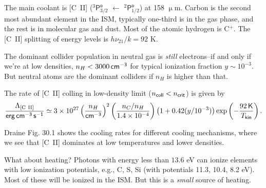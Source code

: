 \documentclass{tufte-handout}
\renewcommand{\rm}{\sf}
\renewcommand{\textrm}{\textsf}
\renewcommand{\smallcaps}[1]{{\smaller~\textsc{#1}}}
\newcommand{\spec}[2]{\textnormal{#1}\smallcaps{#2}} %
\newcommand{\term}[4]{$^{#1}\textrm{#2}_{#3}^{\textrm{#4}}$}
\newcommand{\m}{\upmu} %
\newcommand{\um}{$\m{}$m}
\begin{document}
The main coolant is [\spec{C}{II}] (\term{3}{P}{3/2}{o} $\leftarrow$ \term{2}{P}{1/2}{o}) at 158 \um{}. Carbon is the second most abundant element in the ISM, typically one-third is in the gas phase, and the rest is in molecular gas and dust. Most of the atomic hydrogen is C$^+$. The [\spec{C}{II}] splitting of energy levels is $h\nu_{21}/k = 92 $ K.

The dominant collider population in neutral gas is \textit{still} electrons--if and only if we're at low densities, $n_H < 3000 {\rm\, cm^{-3}}$ for typical ionization fraction $y \sim 10^{-3}$. But neutral atoms are the dominant colliders if $n_H$ is higher than that.

The rate of [\spec{C}{II}] colling in low-density limit ($n_{\rm coll} < n_{\rm crit}$) is given by
\begin{equation}
\frac{\Lambda_{[\spec{C}{II}]}}{\rm erg\, cm^{-3}\, s^{-1}} \simeq 3\times 10^{27} \left (\frac{n_H}{\rm cm^{-3}}\right )^{2}\left (\frac{n_C/n_H}{1.4 \times 10^{-4}}\right )\left (1 + 0.42(y/10^{-3})\right ) \exp\left (-\frac{92 \,\rm K}{T_{\rm kin}}\right ).
\end{equation}

Draine Fig. 30.1 shows the cooling rates for different cooling mechanisms, where we see that [\spec{C}{II}] dominates at low temperatures and lower densities.

What about heating? Photons with energy less than $13.6$ eV can ionize elements with low ionization potentials, e.g., C, S, Si (with potentials 11.3, 10.4, 8.2 eV). Most of these will be ionized in the ISM. But this is a \textit{small} source of heating.
\end{document}
